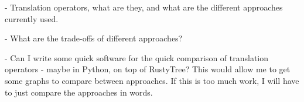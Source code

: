 - Translation operators, what are they, and what are the different approaches currently used.

- What are the trade-offs of different approaches?

- Can I write some quick software for the quick comparison of translation operators - maybe in Python, on top of RustyTree? This would allow me to get some graphs to compare between approaches. If this is too much work, I will have to just compare the approaches in words.



